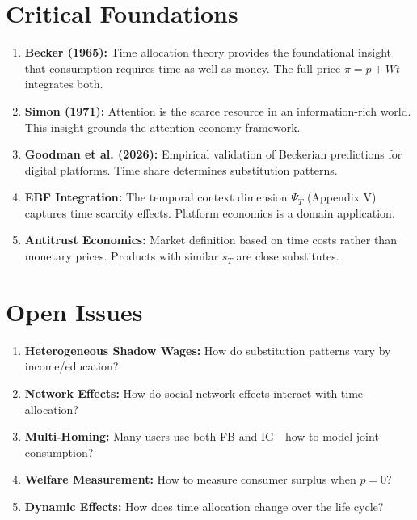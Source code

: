 \section{Critical Foundations}
\label{sec:pt-foundations}

\begin{enumerate}
\item \textbf{Becker (1965):} Time allocation theory provides the foundational insight that consumption requires time as well as money. The full price $\pi = p + Wt$ integrates both.

\item \textbf{Simon (1971):} Attention is the scarce resource in an information-rich world. This insight grounds the attention economy framework.

\item \textbf{Goodman et al. (2026):} Empirical validation of Beckerian predictions for digital platforms. Time share determines substitution patterns.

\item \textbf{EBF Integration:} The temporal context dimension $\Psi_T$ (Appendix V) captures time scarcity effects. Platform economics is a domain application.

\item \textbf{Antitrust Economics:} Market definition based on time costs rather than monetary prices. Products with similar $s_T$ are close substitutes.
\end{enumerate}

\section{Open Issues}
\label{sec:pt-open}

\begin{enumerate}
\item \textbf{Heterogeneous Shadow Wages:} How do substitution patterns vary by income/education?
\item \textbf{Network Effects:} How do social network effects interact with time allocation?
\item \textbf{Multi-Homing:} Many users use both FB and IG---how to model joint consumption?
\item \textbf{Welfare Measurement:} How to measure consumer surplus when $p=0$?
\item \textbf{Dynamic Effects:} How does time allocation change over the life cycle?
\end{enumerate}

